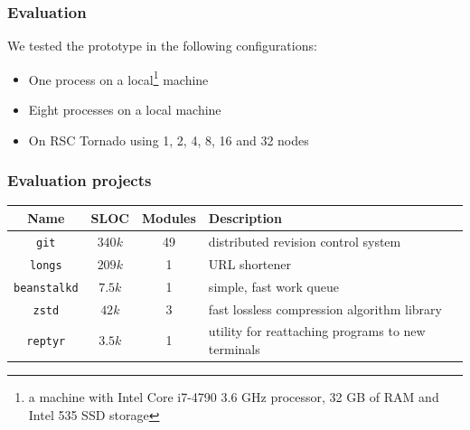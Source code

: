 
\begin{frame}
\frametitle{Evaluation}
We tested the prototype in the following configurations:
	\begin{itemize}
		\item One process on a local\footnote{a machine with Intel Core i7-4790 3.6 GHz processor, 32 GB of RAM and Intel 535 SSD storage} machine
		\item Eight processes on a local machine
		\item On RSC Tornado using 1, 2, 4, 8, 16 and 32 nodes
	\end{itemize}
	 
\end{frame}


\begin{frame}
\frametitle{Evaluation projects}
\begin{table}[tbh]
\centering
\label{table:projects}
\begin{adjustbox}{max width=\textwidth}
\begin{tabular}{|c|c|c|l|}
\hline
Name & SLOC & Modules & Description \\ \hline
\texttt{git} & $340k$ & 49 & distributed revision control system \\ \hline
\texttt{longs} & $209k$ & 1  & URL shortener \\ \hline
\texttt{beanstalkd} & $7.5k$ & 1  & simple, fast work queue \\ \hline
\texttt{zstd} & $42k$  & 3  & fast lossless compression algorithm library \\ \hline
\texttt{reptyr} & $3.5k$ & 1  & utility for reattaching programs to new terminals \\ \hline
\end{tabular}
\end{adjustbox}
\end{table}
\end{frame}


